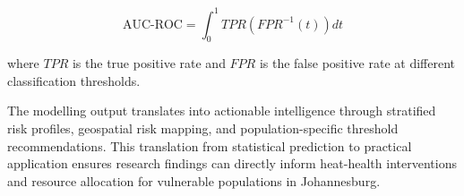 \begin{equation}
\text{AUC-ROC} = \int^1_0 TPR(FPR^{-1}(t))dt
\end{equation}

where $TPR$ is the true positive rate and $FPR$ is the false positive rate at different classification thresholds.

The modelling output translates into actionable intelligence through stratified risk profiles, geospatial risk mapping, and population-specific threshold recommendations. This translation from statistical prediction to practical application ensures research findings can directly inform heat-health interventions and resource allocation for vulnerable populations in Johannesburg.